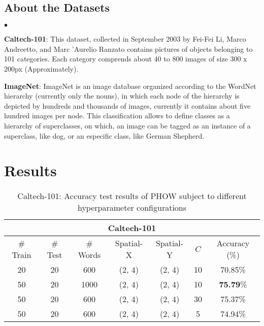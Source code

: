 \documentclass[10pt,twocolumn,letterpaper]{article}
\newcommand{\squishlist}{
 \begin{list}{$\bullet$}
  { \setlength{\itemsep}{0pt}
     \setlength{\parsep}{3pt}
     \setlength{\topsep}{3pt}
     \setlength{\partopsep}{0pt}
     \setlength{\leftmargin}{1.5em}
     \setlength{\labelwidth}{1em}
     \setlength{\labelsep}{0.5em} } }
\newcommand{\squishend}{
  \end{list}  }
\begin{document}
\subsection*{About the Datasets}
\squishlist
\item \textbf{Caltech-101}: This dataset, collected in September 2003 by Fei-Fei Li, Marco Andreetto, and Marc 'Aurelio Ranzato contains pictures of objects belonging to 101 categories. Each category comprends about 40 to 800 images of size 300 x 200px (Approximately).
\item \textbf{ImageNet}: ImageNet is an image database organized according to the WordNet hierarchy (currently only the nouns), in which each node of the hierarchy is depicted by hundreds and thousands of images, currently it contains about five hundred images per node. This classification allows to define classes as a hierarchy of superclasses, on which, an image can be tagged as an instance of a superclass, like dog, or an especific class, like German Shepherd.
\squishend


\section{Results}
\begin{table*}
	\centering
	\begin{tabular}{|c|c|c|c|c|c|c|}
		\hline
		\multicolumn{7}{|c|}{Caltech-101} \\
		\hline
		\# Train & \# Test & \# Words & Spatial-X & Spatial-Y & $C$ & Accuracy (\%) \\
		\hline
		20 & 20 & 600 & (2, 4) & (2, 4) & 10 & 70.85\% \\
		\hline
		50 & 20 & 1000 & (2, 4) & (2, 4) & 10 & \textbf{75.79}\% \\
		\hline
		50 & 20 & 600 & (2, 4) & (2, 4) & 30 & 75.37\% \\
		\hline
		50 & 20 & 600 & (2, 4) & (2, 4) & 5 & 74.94\% \\
		\hline
	\end{tabular}
	\caption{Caltech-101: Accuracy test results of PHOW subject to different hyperparameter configurations}
	\label{Tab:Cal}
\end{table*}
\end{document}
